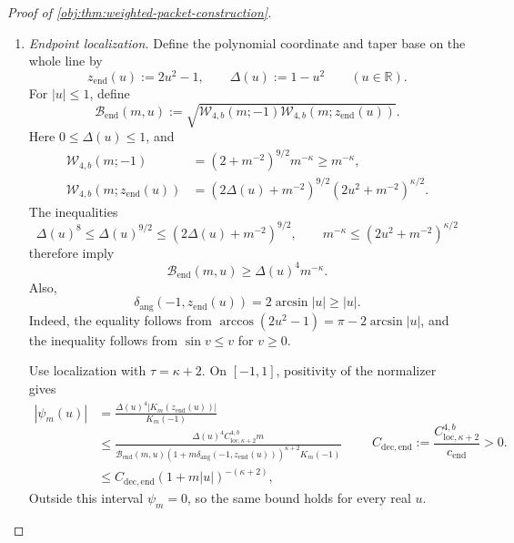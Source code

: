 \documentclass[11pt]{article}
\begin{document}
\begin{proof}[Proof of \cref{obj:thm:weighted-packet-construction}]
\begin{enumerate}
\item \emph{Endpoint localization.}
Define the polynomial coordinate and taper base on the whole line by
\[
z_{\mathrm{end}}(u):=2u^2-1,
\qquad
\Delta(u):=1-u^2
\qquad(u\in\mathbb R).
\]
For \(|u|\le1\), define
\[
\mathcal B_{\mathrm{end}}(m,u)
:=
\sqrt{\mathcal W_{4,b}(m;-1)
      \mathcal W_{4,b}(m;z_{\mathrm{end}}(u))}.
\]
Here \(0\le\Delta(u)\le1\), and
\[
\begin{split}
\mathcal W_{4,b}(m;-1)
&=(2+m^{-2})^{9/2}m^{-\kappa}
\ge m^{-\kappa},\\
\mathcal W_{4,b}(m;z_{\mathrm{end}}(u))
&=(2\Delta(u)+m^{-2})^{9/2}
  (2u^2+m^{-2})^{\kappa/2}.
\end{split}
\]
The inequalities
\[
\Delta(u)^8
\le\Delta(u)^{9/2}
\le(2\Delta(u)+m^{-2})^{9/2},
\qquad
m^{-\kappa}\le(2u^2+m^{-2})^{\kappa/2}
\]
therefore imply
\[
\mathcal B_{\mathrm{end}}(m,u)
\ge\Delta(u)^4m^{-\kappa}.
\]
Also,
\[
\delta_{\mathrm{ang}}(-1,z_{\mathrm{end}}(u))
=2\arcsin|u|
\ge|u|.
\]
Indeed, the equality follows from
\(\arccos(2u^2-1)=\pi-2\arcsin|u|\), and the inequality follows from
\(\sin v\le v\) for \(v\ge0\).

Use localization with \(\tau=\kappa+2\). On \([-1,1]\), positivity of the normalizer gives
\[
\begin{split}
|\psi_m(u)|
&=
\frac{\Delta(u)^4|K_m(z_{\mathrm{end}}(u))|}{K_m(-1)}\\
&\le
\frac{\Delta(u)^4 C_{\mathrm{loc},\kappa+2}^{4,b}m}
{\mathcal B_{\mathrm{end}}(m,u)
 (1+m\delta_{\mathrm{ang}}(-1,z_{\mathrm{end}}(u)))^{\kappa+2}
 K_m(-1)}\\
&\le
C_{\mathrm{dec,end}}(1+m|u|)^{-(\kappa+2)},
\end{split}
\qquad
C_{\mathrm{dec,end}}
:=
\frac{C_{\mathrm{loc},\kappa+2}^{4,b}}{c_{\mathrm{end}}}>0.
\]
Outside this interval \(\psi_m=0\), so the same bound holds for every real \(u\).


\end{enumerate}
\end{proof}
\end{document}
